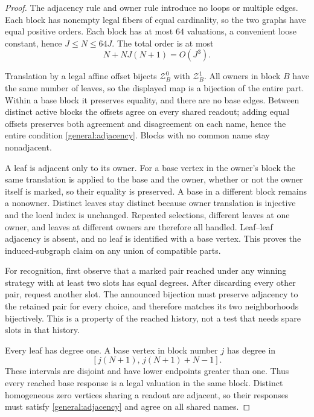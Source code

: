 \documentclass[11pt]{article}
\theoremstyle{definition}
\newcommand{\cZ}{\mathcal Z}
\begin{document}
\begin{proof}
The adjacency rule and owner rule introduce no loops or multiple
edges. Each block has nonempty legal fibers of equal cardinality,
so the two graphs have equal positive orders. Each block has at
most \(64\) valuations, a convenient loose constant, hence
\(J\le N\le64J\). The total order is at most
\[
       N+NJ(N+1)=O(J^3).
\]

Translation by a legal affine offset bijects \(\cZ_B^0\) with
\(\cZ_B^1\). All owners in block \(B\) have the same number of
leaves, so the displayed map is a bijection of the entire part.
Within a base block it preserves equality, and there are no base
edges. Between distinct active blocks the offsets agree on every
shared readout; adding equal offsets preserves both agreement and
disagreement on each name, hence the entire condition
\eqref{general:adjacency}. Blocks with no common name stay
nonadjacent.

A leaf is adjacent only to its owner. For a base vertex in the
owner's block the same translation is applied to the base and the
owner, whether or not the owner itself is marked, so their equality
is preserved. A base in a different block remains a nonowner.
Distinct leaves stay distinct because owner translation is
injective and the local index is unchanged. Repeated selections,
different leaves at one owner, and leaves at different owners are
therefore all handled. Leaf--leaf adjacency is absent, and no leaf
is identified with a base vertex. This proves the induced-subgraph
claim on any union of compatible parts.

For recognition, first observe that a marked pair reached under
any winning strategy with at least two slots has equal degrees.
After discarding every other pair, request another slot. The
announced bijection must preserve adjacency to the retained pair
for every choice, and therefore matches its two neighborhoods
bijectively. This is a property of the reached history, not a test
that needs spare slots in that history.

Every leaf has degree one. A base vertex in block number \(j\)
has degree in
\[
       [j(N+1),\,j(N+1)+N-1].
\]
These intervals are disjoint and have lower endpoints greater
than one. Thus every reached base response is a legal valuation
in the same block. Distinct homogeneous zero vertices sharing
a readout are adjacent, so their responses must satisfy
\eqref{general:adjacency} and agree on all shared names.
\end{proof}
\end{document}
